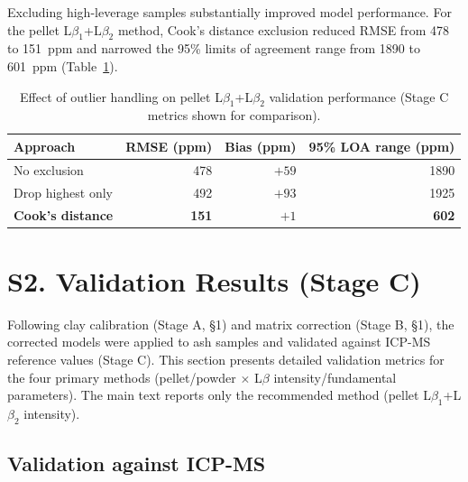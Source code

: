 \documentclass[journal=esthag,manuscript=suppinfo]{achemso}
\begin{document}
Excluding high-leverage samples substantially improved model performance. For the pellet L$\beta_1$+L$\beta_2$ method, Cook's distance exclusion reduced RMSE from 478 to 151~ppm and narrowed the 95\% limits of agreement range from 1890 to 601~ppm (Table~\ref{tab:outlier_sensitivity}).

\begin{table}[htbp]
\caption{Effect of outlier handling on pellet L$\beta_1$+L$\beta_2$ validation performance (Stage C metrics shown for comparison).}
\label{tab:outlier_sensitivity}
\centering
\small
\begin{tabular}{lrrr}
\toprule
Approach & RMSE (ppm) & Bias (ppm) & 95\% LOA range (ppm) \\
\midrule
No exclusion               & 478  & $+59$  & 1890 \\
Drop highest only          & 492  & $+93$  & 1925 \\
\textbf{Cook's distance}   & \textbf{151} & \textbf{$+1$} & \textbf{602} \\
\bottomrule
\end{tabular}
\end{table}

\newpage


\section*{S2. Validation Results (Stage C)}

Following clay calibration (Stage A, \S1) and matrix correction (Stage B, \S1), the corrected models were applied to ash samples and validated against ICP-MS reference values (Stage C). This section presents detailed validation metrics for the four primary methods (pellet/powder $\times$ L$\beta$ intensity/fundamental parameters). The main text reports only the recommended method (pellet L$\beta_1$+L$\beta_2$ intensity).

\subsection*{Validation against ICP-MS}
\end{document}
